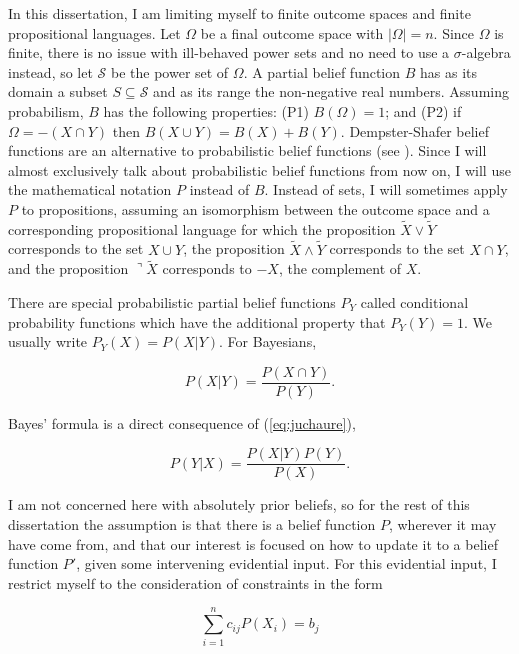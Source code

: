 \documentclass[phd,12pt,oneside]{ubcthesis}
\begin{document}
In this dissertation, I am limiting myself to finite outcome spaces
and finite propositional languages. Let $\Omega$ be a final outcome
space with $|\Omega|=n$. Since $\Omega$ is finite, there is no issue
with ill-behaved power sets and no need to use a $\sigma$-algebra
instead, so let $\mathcal{S}$ be the power set of $\Omega$. A partial
belief function $B$ has as its domain a subset $S\subseteq\mathcal{S}$
and as its range the non-negative real numbers. Assuming probabilism,
$B$ has the following properties: (P1) $B(\Omega)=1$; and (P2) if
$\Omega=-(X\cap{}Y)$ then $B(X\cup{}Y)=B(X)+B(Y)$. Dempster-Shafer
belief functions are an alternative to probabilistic belief functions
(see ). Since I will almost exclusively talk
about probabilistic belief functions from now on, I will use the
mathematical notation $P$ instead of $B$. Instead of sets, I will
sometimes apply $P$ to propositions, assuming an isomorphism between
the outcome space and a corresponding propositional language for which
the proposition $\tilde{X}\vee{}\tilde{Y}$ corresponds to the set
$X\cup{}Y$, the proposition $\tilde{X}\wedge{}\tilde{Y}$ corresponds
to the set $X\cap{}Y$, and the proposition $\urcorner\tilde{X}$
corresponds to $-X$, the complement of $X$.

There are special probabilistic partial belief functions $P_{Y}$
called conditional probability functions which have the additional property
that $P_{Y}(Y)=1$. We usually write $P_{Y}(X)=P(X|Y)$. For Bayesians,

\begin{equation}
  \label{eq:juchaure}
  P(X|Y)=\frac{P(X\cap{}Y)}{P(Y)}.
\end{equation}

{\noindent}Bayes' formula is a direct consequence of (\ref{eq:juchaure}),

\begin{equation}
  \label{eq:aegoopei}
  P(Y|X)=\frac{P(X|Y)P(Y)}{P(X)}.
\end{equation}

{\noindent}I am not concerned here with absolutely prior beliefs, so for the rest
of this dissertation the assumption is that there is a belief function
$P$, wherever it may have come from, and that our interest is focused
on how to update it to a belief function $P'$, given some intervening
evidential input. For this evidential input, I restrict myself to
the consideration of constraints in the form 

\begin{equation}
  \label{eq:ahghaega}
  \sum_{i=1}^{n}c_{ij}P(X_{i})=b_{j}
\end{equation}
\end{document}

